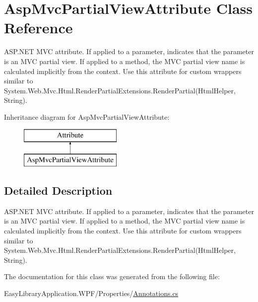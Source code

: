 \hypertarget{class_asp_mvc_partial_view_attribute}{}\section{Asp\+Mvc\+Partial\+View\+Attribute Class Reference}
\label{class_asp_mvc_partial_view_attribute}


A\+S\+P.\+N\+ET M\+VC attribute. If applied to a parameter, indicates that the parameter is an M\+VC partial view. If applied to a method, the M\+VC partial view name is calculated implicitly from the context. Use this attribute for custom wrappers similar to {\ttfamily System.\+Web.\+Mvc.\+Html.\+Render\+Partial\+Extensions.\+Render\+Partial(\+Html\+Helper, String)}.  


Inheritance diagram for Asp\+Mvc\+Partial\+View\+Attribute\+:\begin{figure}[H]
\begin{center}
\leavevmode
\includegraphics[height=2.000000cm]{class_asp_mvc_partial_view_attribute}
\end{center}
\end{figure}


\subsection{Detailed Description}
A\+S\+P.\+N\+ET M\+VC attribute. If applied to a parameter, indicates that the parameter is an M\+VC partial view. If applied to a method, the M\+VC partial view name is calculated implicitly from the context. Use this attribute for custom wrappers similar to {\ttfamily System.\+Web.\+Mvc.\+Html.\+Render\+Partial\+Extensions.\+Render\+Partial(\+Html\+Helper, String)}. 



The documentation for this class was generated from the following file\+:\begin{DoxyCompactItemize}
\item 
Easy\+Library\+Application.\+W\+P\+F/\+Properties/\mbox{\hyperlink{_annotations_8cs}{Annotations.\+cs}}\end{DoxyCompactItemize}
